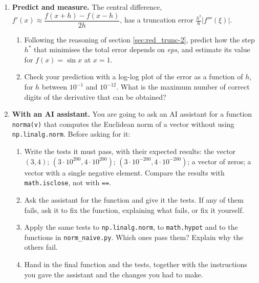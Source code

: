 \begin{enumerate}
\begin{verbatim}
def raices_A(a, b, c):
    d = math.sqrt(b**2 - 4*a*c)
    return (-b + d) / (2*a), (-b - d) / (2*a)

def raices_B(a, b, c):
    d = math.sqrt(b**2 - 4*a*c)
    q = -(b + math.copysign(d, b)) / 2
    return q / a, c / q

def raices_C(a, b, c):
    d = math.sqrt(b**2 - 4*a*c)
    x1 = (-b - d) / (2*a)
    return x1, c / (a*x1)
\end{verbatim}
\begin{enumerate}
\item Test them with $a=1$, $b=10^8$, $c=1$ and with $a=1$, $b=-10^8$, $c=1$. Which one is correct in all cases? How can you tell without knowing the exact roots? (Hint: the product of the roots is $c/a$ and their sum is $-b/a$.)
\item Explain, in terms of catastrophic cancellation, why the other two fail.
\end{enumerate}

\item \textbf{Predict and measure.} The central difference, $f'(x)\approx\dfrac{f(x+h)-f(x-h)}{2h}$, has a truncation error $\frac{h^2}{6}\vert f'''(\xi)\vert$.
\begin{enumerate}
\item Following the reasoning of section \ref{sec:red_trunc-2}, predict how the step $h^*$ that minimises the total error depends on \emph{eps}, and estimate its value for $f(x)=\sin x$ at $x=1$.
\item Check your prediction with a log-log plot of the error as a function of $h$, for $h$ between $10^{-1}$ and $10^{-12}$. What is the maximum number of correct digits of the derivative that can be obtained?
\end{enumerate}

\item \label{ej:norma_ia-en} \textbf{With an AI assistant.} You are going to ask an AI assistant for a function \texttt{norma(v)} that computes the Euclidean norm of a vector without using \texttt{np.linalg.norm}. Before asking for it:
\begin{enumerate}
\item Write the tests it must pass, with their expected results: the vector $(3,4)$; $(3\cdot10^{200},4\cdot10^{200})$; $(3\cdot10^{-200},4\cdot10^{-200})$; a vector of zeros; a vector with a single negative element. Compare the results with \texttt{math.isclose}, not with \texttt{==}.
\item Ask the assistant for the function and give it the tests. If any of them fails, ask it to fix the function, explaining what fails, or fix it yourself.
\item Apply the same tests to \texttt{np.linalg.norm}, to \texttt{math.hypot} and to the functions in \texttt{norm\_naive.py}. Which ones pass them? Explain why the others fail.
\item Hand in the final function and the tests, together with the instructions you gave the assistant and the changes you had to make.
\end{enumerate}
\end{enumerate}
\fussy
